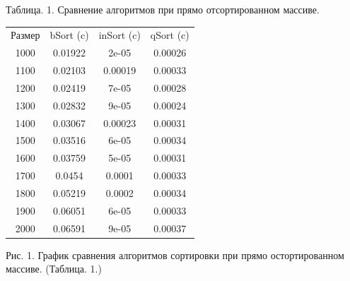 \documentclass[12pt]{report}
\begin{document}
\begin{center}
	Таблица. 1. Сравнение алгоритмов при прямо отсортированном массиве.
	\begin{tabular}{|c c c c|}
		\hline
		Размер & bSort (c) & inSort (c) & qSort (c) \\ [0.5ex]
		1000 & 0.01922 & 2e-05 & 0.00026 \\ 
		\hline 
		1100 & 0.02103 & 0.00019 & 0.00033 \\ 
		\hline 
		1200 & 0.02419 & 7e-05 & 0.00028 \\ 
		\hline 
		1300 & 0.02832 & 9e-05 & 0.00024 \\ 
		\hline 
		1400 & 0.03067 & 0.00023 & 0.00031 \\ 
		\hline 
		1500 & 0.03516 & 6e-05 & 0.00034 \\ 
		\hline 
		1600 & 0.03759 & 5e-05 & 0.00031 \\ 
		\hline 
		1700 & 0.0454 & 0.0001 & 0.00033 \\ 
		\hline 
		1800 & 0.05219 & 0.0002 & 0.00034 \\ 
		\hline 
		1900 & 0.06051 & 6e-05 & 0.00033 \\ 
		\hline 
		2000 & 0.06591 & 9e-05 & 0.00037 \\ 
		\hline 
	\end{tabular}
\end{center}
		\begin{center}
			\begin{center}
			\end{center}
			Рис. 1. График сравнения алгоритмов сортировки при прямо остортированном массиве. (Таблица. 1.)
		\end{center}
\end{document}
